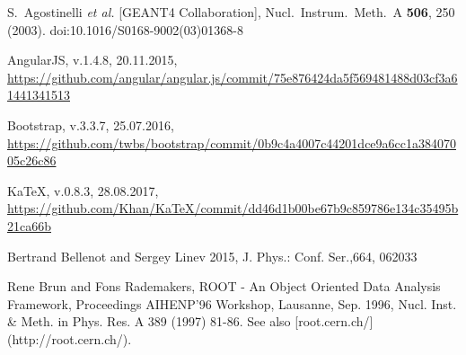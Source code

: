 \begin{thebibliography}{}
%
%
S.~Agostinelli {\it et al.} [GEANT4 Collaboration],
  Nucl.\ Instrum.\ Meth.\ A {\bf 506}, 250 (2003).
  doi:10.1016/S0168-9002(03)01368-8

AngularJS, v.1.4.8, 20.11.2015, \url{https://github.com/angular/angular.js/commit/75e876424da5f569481488d03cf3a61441341513}

Bootstrap, v.3.3.7, 25.07.2016, \url{https://github.com/twbs/bootstrap/commit/0b9c4a4007c44201dce9a6cc1a38407005c26c86}

KaTeX, v.0.8.3, 28.08.2017,
\url{https://github.com/Khan/KaTeX/commit/dd46d1b00be67b9c859786e134c35495b21ca66b}

Bertrand Bellenot and Sergey Linev 2015, J. Phys.: Conf. Ser.,664,  062033

    Rene Brun and Fons Rademakers,
    ROOT - An Object Oriented Data Analysis Framework,
    Proceedings AIHENP'96 Workshop, Lausanne, Sep. 1996, Nucl. Inst. & Meth. in Phys. Res. A 389 (1997) 81-86. See also [root.cern.ch/](http://root.cern.ch/).

\end{thebibliography}